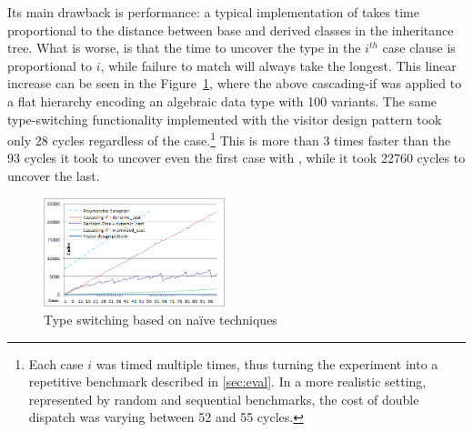 \noindent
Its main drawback is performance: a typical 
implementation of  takes time proportional to the 
distance between base and derived classes in the inheritance tree.
What is worse, is that the time to uncover the type in the $i^{th}$ case clause 
is proportional to $i$, while failure to match will always take the longest. 
This linear increase can be seen in the Figure~\ref{fig:DCastVis1}, where 
the above cascading-if was applied to a flat hierarchy encoding an algebraic 
data type with 100 variants. The same type-switching functionality implemented 
with the visitor design pattern took only 28 cycles regardless of the 
case.\footnote{Each case $i$ was timed multiple times, thus turning the experiment 
into a repetitive benchmark described in \textsection\ref{sec:eval}. In a more
realistic setting, represented by random and sequential benchmarks, the cost of 
double dispatch was varying between 52 and 55 cycles.}
This is more than 3 times faster than the 93 cycles it took to uncover even the 
first case with , while it took 22760 cycles to uncover the 
last.

\begin{figure}[htbp]
  \centering
    \includegraphics[width=0.47\textwidth]{DCast-vs-Visitors1.png}
  \caption{Type switching based on na\"ive techniques}
  \label{fig:DCastVis1}
\end{figure}


